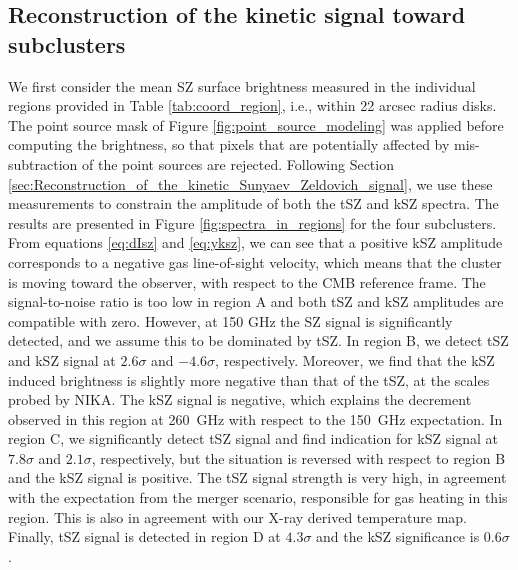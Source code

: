 \documentclass[twocolumn,traditabstract]{aa}
\begin{document}
\subsection{Reconstruction of the kinetic signal toward subclusters}\label{sec:Reconstruction_of_the_kinetic_signal_toward_sub_clusters}
We first consider the mean SZ surface brightness measured in the individual regions provided in Table \ref{tab:coord_region}, i.e., within 22 arcsec radius disks. The point source mask of Figure \ref{fig:point_source_modeling} was applied before computing the brightness, so that pixels that are potentially affected by mis-subtraction of the point sources are rejected. Following Section \ref{sec:Reconstruction_of_the_kinetic_Sunyaev_Zeldovich_signal}, we use these measurements to constrain the amplitude of both the tSZ and kSZ spectra. The results are presented in Figure \ref{fig:spectra_in_regions} for the four subclusters. From equations \ref{eq:dIsz} and \ref{eq:yksz}, we can see that a positive kSZ amplitude corresponds to a negative gas line-of-sight velocity, which means that the cluster is moving toward the observer, with respect to the CMB reference frame. The signal-to-noise ratio is too low in region A and both tSZ and kSZ amplitudes are compatible with zero. However, at 150 GHz the SZ signal is significantly detected, and we assume this to be dominated by tSZ. In region B, we detect tSZ and kSZ signal at $2.6 \sigma$ and $-4.6 \sigma$, respectively. Moreover, we find that the kSZ induced brightness is slightly more negative than that of the tSZ, at the scales probed by NIKA. The kSZ signal is negative, which explains the decrement observed in this region at 260~GHz with respect to the 150~GHz expectation. In region C, we significantly detect tSZ signal and find indication for kSZ signal at $7.8 \sigma$ and $2.1 \sigma$, respectively, but the situation is reversed with respect to region B and the kSZ signal is positive. The tSZ signal strength is very high, in agreement with the expectation from the merger scenario, responsible for gas heating in this region. This is also in agreement with our X-ray derived temperature map. Finally, tSZ signal is detected in region D at $4.3 \sigma$ and the kSZ significance is $0.6 \sigma$.
\end{document}
